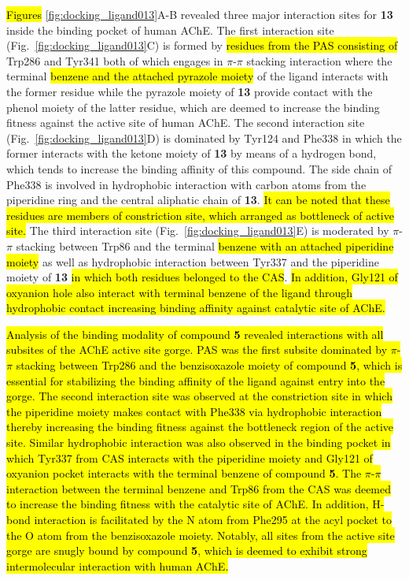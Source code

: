\documentclass[fleqn,10pt]{wlpeerj}
\begin{document}
\hl{Figures} \ref{fig:docking_ligand013}A-B revealed three major interaction sites for \textbf{13} inside the binding pocket of human AChE. The first interaction site (Fig.~\ref{fig:docking_ligand013}C) is formed by \hl{residues from the PAS consisting of} Trp286 and Tyr341 both of which engages in  $\pi$-$\pi$ stacking interaction where the terminal \hl{benzene and the attached pyrazole moiety} of the ligand interacts with the former residue while the pyrazole moiety of \textbf{13} provide contact with the phenol moiety of the latter residue, which are deemed to increase the binding fitness against the active site of human AChE. 
The second interaction site (Fig.~\ref{fig:docking_ligand013}D) is dominated by Tyr124 and Phe338 in which the former interacts with the ketone moiety of \textbf{13} by means of a hydrogen bond, which tends to increase the binding affinity of this compound. The side chain of Phe338 is involved in hydrophobic interaction with carbon atoms from the piperidine ring and the central aliphatic chain of \textbf{13}. \hl{It can be noted that these residues are members of constriction site, which arranged as bottleneck of active site.}
The third interaction site (Fig.~\ref{fig:docking_ligand013}E) is moderated by $\pi$-$\pi$ stacking between Trp86 and the terminal \hl{benzene with an attached piperidine moiety} as well as hydrophobic interaction between Tyr337 and the piperidine moiety of \textbf{13} \hl{in which both residues belonged to the CAS}. \hl{In addition, Gly121 of oxyanion hole also interact with terminal benzene of the ligand through hydrophobic contact increasing binding affinity against catalytic site of AChE.}

\hl{Analysis of the binding modality of compound \textbf{5} revealed interactions with all subsites of the AChE active site gorge. PAS was the first subsite dominated by $\pi$-$\pi$ stacking between Trp286 and the benzisoxazole moiety of compound \textbf{5}, which is essential for stabilizing the binding affinity of the ligand against entry into the gorge. The second interaction site was observed at the constriction site in which the piperidine moiety makes contact with Phe338 via hydrophobic interaction thereby increasing the binding fitness against the bottleneck region of the active site. Similar hydrophobic interaction was also observed in the binding pocket in which Tyr337 from CAS interacts with the piperidine moiety and Gly121 of oxyanion pocket interacts with the terminal benzene of compound \textbf{5}. The $\pi$-$\pi$ interaction between the terminal benzene and Trp86 from the CAS was deemed to increase the binding fitness with the catalytic site of AChE. In addition, H-bond interaction is facilitated by the N atom from Phe295 at the acyl pocket to the O atom from the benzisoxazole moiety. Notably, all sites from the active site gorge are snugly bound by compound \textbf{5}, which is deemed to exhibit strong intermolecular interaction with human AChE.}
\end{document}
